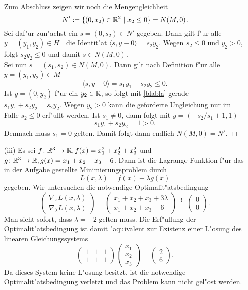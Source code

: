 \begin{itemize}
Zum Abschluss zeigen wir noch die Mengengleichheit
\[
N':= \{(0,x_2) \in \mathbb{R}^2 \mid x_2 \le 0\} = N(M,0).
\]
Sei daf"ur zun"achst ein $s = (0,s_2) \in N'$ gegeben. Dann gilt f"ur alle
$y = (y_1, y_2) \in H^+$ die Identit"at
$
\langle s,y-0 \rangle = s_2 y_2
$.
Wegen $s_2 \le 0$ und $y_2 > 0$, folgt $s_2 y_2 \le 0$ und damit $s \in N(M,0)$.\\

Sei nun $s=(s_1, s_2) \in N(M,0)$. Dann gilt nach Definition f"ur alle $y = (y_1, y_2)\in M$
\begin{equation}\label{blabla}
\langle s,y-0 \rangle = s_1 y_1 + s_2 y_2 \le 0.
\end{equation}
Ist $y = (0, y_2)$ f"ur ein $y_2 \in \mathbb{R}$, so folgt mit \eqref{blabla}
gerade $s_1 y_1 + s_2 y_2= s_2 y_2$. Wegen $y_2 > 0$ kann die geforderte Ungleichung
nur im Falle $s_2 \le 0$ erf"ullt werden. Ist $s_1 \neq 0$, dann folgt mit $y=(-s_2/s_1 + 1, 1)$
\[
s_1 y_1 + s_2 y_2 = 1 > 0.
\]
Demnach muss $s_1 = 0$ gelten. Damit folgt dann endlich $N(M,0)= N'$. \hfill $\Box$

\item[(iii)] Es sei $f\colon\mathbb{R}^3 \to \mathbb{R}, f(x) = x_1^2 + x_2^2 + x_3^2$ und
$g\colon\mathbb{R}^3 \to \mathbb{R}, g(x) = x_1 + x_2 + x_3 - 6$. Dann ist die Lagrange-Funktion
f"ur das in der Aufgabe gestellte Minimierungsproblem durch
\[
L(x, \lambda) = f(x) + \lambda g(x)
\]
gegeben. Wir untersuchen die notwendige Optimalit"atsbedingung
\[
\begin{pmatrix} \nabla_x L(x, \lambda) \\ \nabla_\lambda L(x, \lambda)\end{pmatrix}
= \begin{pmatrix}
x_1 + x_2 + x_3 + 3\lambda \\ x_1 + x_2 + x_3 - 6 \end{pmatrix}
\overset{!}{=}\begin{pmatrix} 0 \\ 0 \end{pmatrix}.
\]
Man sieht sofort, dass $\lambda = -2$ gelten muss. Die Erf"ullung der Optimalit"atsbedingung
ist damit "aquivalent zur Existenz einer L"osung des linearen Gleichungssystems
\[
\begin{pmatrix} 1 & 1 & 1 \\ 1 & 1 & 1\end{pmatrix}\begin{pmatrix} x_1 \\ x_2 \\ x_3 \end{pmatrix}
= \begin{pmatrix} 2 \\ 6 \end{pmatrix}.
\]
Da dieses System keine L"osung besitzt, ist die notwendige Optimalit"atsbedingung verletzt
und das Problem kann nicht gel"ost werden.
\end{itemize}
